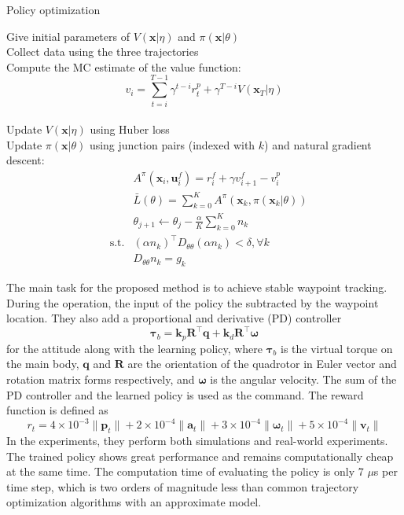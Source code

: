 \documentclass{article}
\newcommand{\B}[1]{\mathbf{#1}}
\begin{document}
\begin{algorithm}
  \caption{Policy optimization}
  \label{algo:policy_optimization}
  Give initial parameters of $V(\B{x} | \eta)$ and $\pi(\B{x} | \theta)$ \\
  {
    Collect data using the three trajectories \\
    Compute the MC estimate of the value function:
    \[
      v_i = \sum_{t=i}^{T-1}\gamma^{t-i}r_t^p + \gamma^{T-i}V(\B{x}_T | \eta)
    \] \\
    Update $V(\B{x} | \eta)$ using Huber loss \\
    Update $\pi(\B{x} | \theta)$ using junction pairs (indexed with $k$) and natural gradient descent: 
    \[
      \begin{aligned}
        &&A^\pi(\B{x}_i, \B{u}_i^f) = r_i^f + \gamma v_{i+1}^f - v_i^p \\
        &&\bar{L}(\theta) = \sum_{k=0}^K A^\pi(\B{x}_k, \pi(\B{x}_k | \theta)) \\
        &&\theta_{j+1} \leftarrow  \theta_j - \frac{\alpha}{K}\sum_{k=0}^K n_k \\
        &\text{s.t.}&(\alpha n_k)^\top D_{\theta \theta}(\alpha n_k) < \delta, \forall k \\
        &&D_{\theta \theta} n_k = g_k
      \end{aligned}
    \]
  }
\end{algorithm}
The main task for the proposed method is to achieve stable waypoint
tracking.
During the operation, the input of the policy the subtracted 
by the waypoint location.
They also add a proportional and derivative (PD) controller 
\[
  \boldsymbol{\tau}_b = \B{k}_p  \B{R}^\top \B{q} + 
  \B{k}_d  \B{R}^\top\boldsymbol{\omega}
\]
for the attitude along with the learning policy, 
where $\boldsymbol{\tau}_b$ is the virtual torque on the main 
body, $\B{q}$ and $\B{R}$ are the orientation of the quadrotor in Euler
vector and rotation matrix forms respectively, and $\boldsymbol{\omega}$
is the angular velocity.
The sum of the PD controller and the learned policy is used 
as the command.
The reward function is defined as 
\[
  r_t = 4\times 10^{-3} \lVert \B{p}_t \rVert  + 
    2 \times 10^{-4} \lVert \B{a}_t \rVert + 
    3 \times 10^{-4} \lVert \boldsymbol{\omega}_t \rVert + 
    5 \times 10^{-4} \lVert \B{v}_t \rVert
\]
In the experiments, they perform both simulations and real-world
experiments. The trained policy shows great performance and 
remains computationally cheap at the same time. 
The computation time of evaluating the policy is only 7 $\mu$s
per time step, which is two orders of magnitude less than common
trajectory optimization algorithms with an approximate model.
\end{document}

